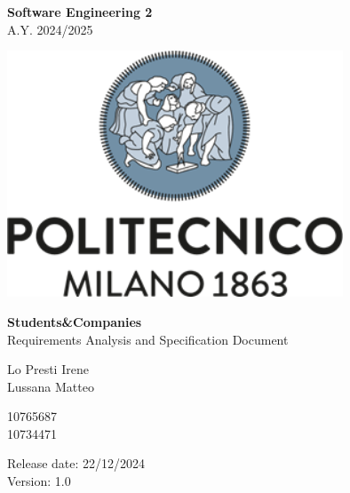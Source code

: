 \documentclass{config/PoliMi3i_thesis}
\numberwithin{algorithm}{chapter}
\begin{document}
%
\fancyhf{} %
\fancyhead[RO,RE]{\thepage} %

\begin{titlepage}

\centering
{\bfseries\LARGE Software Engineering 2\\ 
\vskip0.2cm
}
 \large A.Y. 2024/2025


\vskip1.5cm


\includegraphics[width=10cm]{Images/logopoliazzurro.png}\centering
\vskip2cm

     
\centering
{\bfseries \Huge Students\&Companies\\
\vskip0.5cm
}
\huge Requirements Analysis and Specification Document\\
\vskip1.5cm
\begin{minipage}[t]{0.45\textwidth} %
    \raggedleft %
        {\Large 
            Lo Presti Irene\\ 
            Lussana Matteo\\
        }
\end{minipage}%
\hfill %
\begin{minipage}[t]{0.45\textwidth} %
    \raggedright %
    {\Large 
        10765687 
        \\ 10734471 \\
    }
\end{minipage}

\vskip2cm
\raggedright\large{
 Release date: 22/12/2024\\
 Version: 1.0}


\end{titlepage}

\pagebreak
\end{document}
